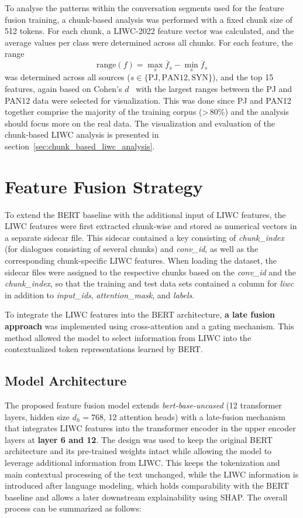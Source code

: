 To analyse the patterns within the conversation segments used for the feature fusion training, a chunk-based analysis was performed with a fixed chunk size of 512 tokens. For each chunk, a LIWC-2022 feature vector was calculated, and the average values per class were determined across all chunks. 
For each feature, the range
\[
\mathrm{range}(f) = \max_{s}\overline{f}_{s} - \min_{s}\overline{f}_ {s}
\]
was determined across all sources (\(s \in \{\mathrm{PJ}, \mathrm{PAN12}, \mathrm{SYN}\}\)), and the top 15 features, again based on Cohen's \(d\)~\cite{cohen1988} with the largest ranges between the PJ and PAN12 data were selected for visualization. This was done since PJ and PAN12 together comprise the majority of the training corpus (>\,80\%) and the analysis should focus more on the real data.
The visualization and evaluation of the chunk-based LIWC analysis is presented in section~\ref{sec:chunk_based_liwc_analysis}.

\section{Feature Fusion Strategy}


To extend the BERT baseline with the additional input of LIWC features, the LIWC features were first extracted chunk-wise and stored as numerical vectors in a separate sidecar file. This sidecar contained a key consisting of \textit{chunk\_index} (for dialogues consisting of several chunks) and  \textit{conv\_id}, as well as the corresponding chunk-specific LIWC features. 
When loading the dataset, the sidecar files were assigned to the respective chunks based on the \textit{conv\_id} and the \textit{chunk\_index}, so that the training and test data sets contained a column for \textit{liwc} in addition to \textit{input\_ids}, \textit{attention\_mask}, and \textit{labels}. 

To integrate the LIWC features into the BERT architecture, \textbf{a late fusion approach} was implemented using cross-attention and a gating mechanism. This method allowed the model to select information from LIWC into the contextualized token representations learned by BERT. 


\subsection{Model Architecture}

The proposed feature fusion model extends \textit{bert-base-uncased} (12 transformer layers, hidden size \(d_h=768\), 12 attention heads) with a late-fusion mechanism that integrates LIWC features into the transformer encoder in the upper encoder layers at \textbf{layer 6 and 12}. The design was used to keep the original BERT architecture and its pre-trained weights intact while allowing the model to leverage additional information from LIWC. This keeps the tokenization and main contextual processing of the text unchanged, while the LIWC information is  introduced after language modeling, which holds comparability with the BERT baseline and allows a later downstream explainability using SHAP. The overall process can be summarized as follows:

